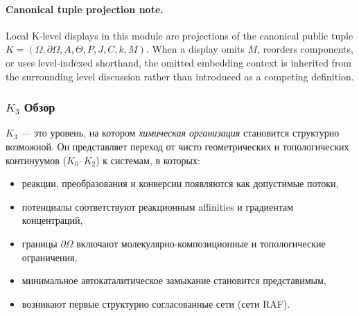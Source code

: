 



\paragraph{Canonical tuple projection note.}
Local K-level displays in this module are projections of the canonical public tuple \(K=(\Omega,\partial\Omega,A,\Theta,P,J,C,k,M)\). When a display omits \(M\), reorders components, or uses level-indexed shorthand, the omitted embedding context is inherited from the surrounding level discussion rather than introduced as a competing definition.

\subsubsection{\texorpdfstring{$K_3$}{K_3} Обзор}
\label{sec:k3-overview}

$K_3$ — это уровень, на котором
\emph{химическая организация} становится
структурно возможной. Он представляет переход от чисто геометрических
и топологических континуумов ($K_0$--$K_2$) к системам, в которых:
\begin{itemize}
    \item реакции, преобразования и конверсии появляются как допустимые
          потоки,
    \item потенциалы соответствуют реакционным affinities и градиентам
          концентраций,
    \item границы $\partial\Omega$ включают молекулярно-композиционные и
          топологические ограничения,
    \item минимальное автокаталитическое замыкание становится представимым,
    \item возникают первые структурно согласованные сети (сети RAF).
\end{itemize}

